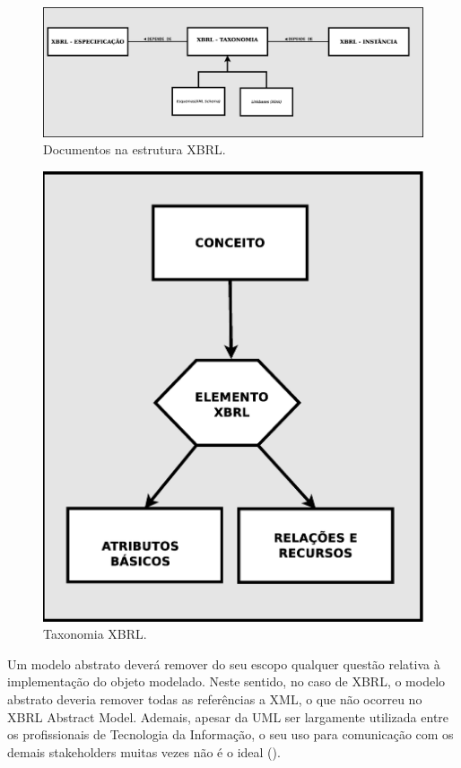 \documentclass[msc,proposal,hidelot,hideabstract]{ppgccufmg} %
\begin{document}
\begin{figure}[hbtp]
\centering
\includegraphics[width=1.0\textwidth]{img/documentos_in_xbrl.eps}
\caption{Documentos na estrutura XBRL.}
\label{fig:fluxo_info_xbrl}
\end{figure}


\begin{figure}[hbtp]
\centering
\includegraphics[width=.75\textwidth]{img/taxonomia.eps}
\caption{Taxonomia XBRL.}
\label{fig:fluxo_info_xbrl}
\end{figure}


Um modelo abstrato deverá remover do seu escopo qualquer questão relativa à implementação do objeto modelado. Neste sentido, no caso de XBRL, o modelo abstrato deveria remover todas as referências a XML, o que não ocorreu no XBRL Abstract Model. Ademais, apesar da UML ser largamente utilizada entre os profissionais de Tecnologia da Informação, o seu uso para comunicação com os demais stakeholders muitas vezes não é o ideal (\cite{peixoto2008comparison}).
\end{document}
